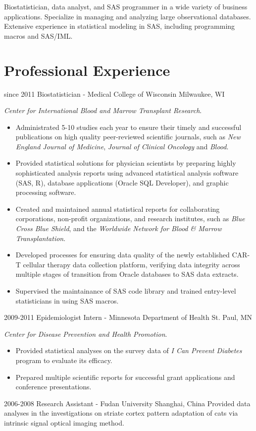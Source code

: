 Biostatistician, data analyst, and SAS programmer in a wide variety of business applications. Specialize in managing and analyzing large observational databases. Extensive experience in statistical modeling in SAS, including programming macros and SAS/IML.\\

\section{Professional Experience}

\begin{entrylist}
  \entry
    {since 2011}
    {Biostatistician - Medical College of Wisconsin}
    {Milwaukee, WI}
    {
    \textit{Center for International Blood and Marrow Transplant Research}.
    \begin{itemize}
      \item Administrated 5-10 studies each year to ensure their timely and successful publications on high quality peer-reviewed scientific journals, such as \textit{New England Journal of Medicine}, \textit{Journal of Clinical Oncology} and \textit{Blood}.
      \item Provided statistical solutions for physician scientists by preparing highly sophisticated analysis reports using advanced statistical analysis software (SAS, R), database applications (Oracle SQL Developer), and graphic processing software.
      \item Created and maintained annual statistical reports for collaborating corporations, non-profit organizations, and research institutes, such as \textit{Blue Cross Blue Shield}, and the \textit{Worldwide Network for Blood \& Marrow Transplantation}.
      \item Developed processes for ensuring data quality of the newly established CAR-T cellular therapy data collection platform, verifying data integrity across multiple stages of transition from Oracle databases to SAS data extracts.
      \item Supervised the maintainance of SAS code library and trained entry-level statisticians in using SAS macros.
    \end{itemize}
    }
  \entry
    {2009-2011}
    {Epidemiologist Intern - Minnesota Department of Health}
    {St. Paul, MN}
    {
    \textit{Center for Disease Prevention and Health Promotion}.
    \begin{itemize}
      \item Provided statistical analyses on the survey data of \textit{I Can Prevent Diabetes} program to evaluate its efficacy.
      \item Prepared multiple scientific reports for successful grant applications and conference presentations.
    \end{itemize}
    }
  \entry
    {2006-2008}
    {Research Assistant - Fudan University}
    {Shanghai, China}
    {Provided data analyses in the investigations on striate cortex pattern adaptation of cats via intrinsic signal optical imaging method.}
\end{entrylist}

